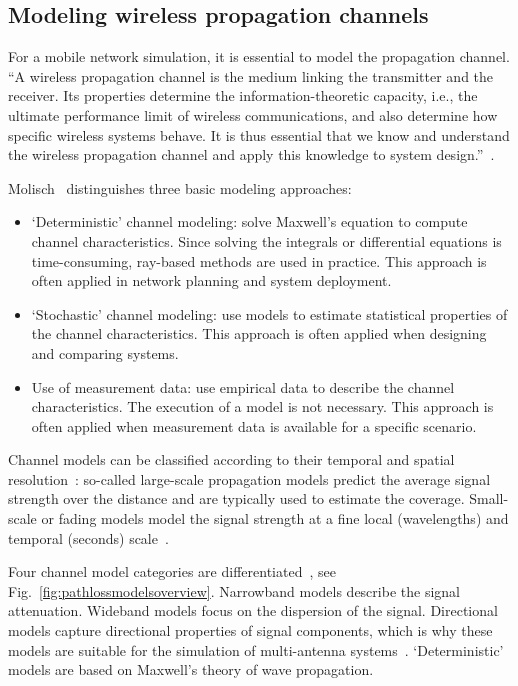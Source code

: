 













\subsection{Modeling wireless propagation channels}
For a mobile network simulation, it is essential to model the propagation channel.
\enquote{A wireless propagation channel is the medium linking the transmitter and the receiver. Its properties determine the information-theoretic capacity, i.e., the ultimate performance limit of wireless communications, and also determine how specific wireless systems behave. It is thus essential that we know and understand the wireless propagation channel and apply this knowledge to system design.}~\cite[p.45]{molisch-2011-com}. 

\newpage

Molisch~\cite[p.125ff]{molisch-2011-com} distinguishes three basic modeling approaches:
\begin{itemize}
\item `Deterministic' channel modeling: solve Maxwell's equation to compute channel characteristics. Since solving the integrals or differential equations is time-consuming, ray-based methods are used in practice. This approach is often applied in network planning and system deployment.
\item `Stochastic' channel modeling: use models to estimate statistical properties of the channel characteristics. This approach is often applied when designing and comparing systems.
\item Use of measurement data: use empirical data to describe the channel characteristics. The execution of a model is not necessary. This approach is often applied when measurement data is available for a specific scenario.
\end{itemize}

Channel models can be classified according to their temporal and spatial resolution~\cite[p.70]{rappaport-2001-com}: so-called large-scale propagation models predict the average signal strength over the distance and are typically used to estimate the coverage. Small-scale or fading models model the signal strength at a fine local (wavelengths) and temporal (seconds) scale~\cite[p.70]{rappaport-2001-com}.


Four channel model categories are differentiated~\cite{molisch-2011-com}, see Fig.~\ref{fig:pathlossmodelsoverview}. Narrowband models describe the signal attenuation. Wideband models focus on the dispersion of the signal. Directional models capture directional properties of signal components, which is why these models are suitable for the simulation of multi-antenna systems~\cite[p.445]{molisch-2011-com}. `Deterministic' models are based on Maxwell's theory of wave propagation.

